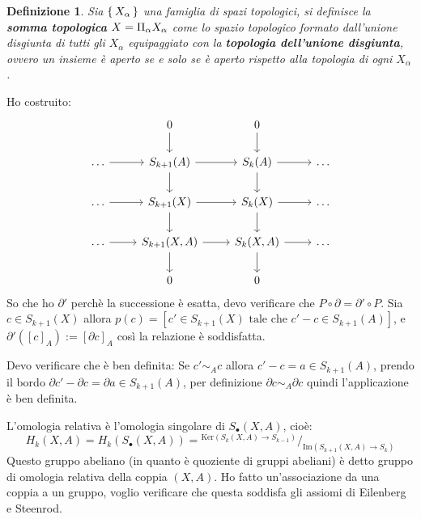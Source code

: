 \documentclass[10pt, twoside=false, x11names]{scrbook}
\newtheorem{definition}[theorem]{Definizione}
\newcommand{\im}[1]{\mathrm{Im}( #1 )}
\renewcommand{\ker}[1]{\mathrm{Ker}( #1)}
\newcommand{\invamalg}{\mathbin{\text{\rotatebox[origin=c]{180}{$\amalg$}}}}
\newcommand*\quot[2]{{^{\textstyle #1}\big/_{\textstyle #2}}}
\begin{document}
\begin{definition}
  Sia $ \set{X_\alpha} $ una famiglia di spazi topologici, si definisce la \textbf{somma topologica}
  $ X = \invamalg_\alpha X_\alpha $
  come lo spazio topologico formato dall'unione disgiunta di tutti gli $ X_\alpha $ equipaggiato
  con la \textbf{topologia dell'unione disgiunta},
  ovvero un insieme è aperto se e solo se è aperto rispetto alla topologia di ogni $ X_\alpha $.
\end{definition}


Ho costruito:
\[
  \begin{tikzcd}
    {} & 0 \arrow{d}{} & 0 \arrow{d}{} & {} \\
    \dots \arrow{r}{} & S_{k+1}(A) \arrow{r}{} \arrow{d}{} & S_k(A) \arrow{r}{} \arrow{d}{} & \dots \\
    \dots \arrow{r}{} & S_{k+1}(X) \arrow{r}{} \arrow{d}{} & S_k(X) \arrow{r}{} \arrow{d}{} & \dots \\
    \dots \arrow{r}{} & S_{k+1}(X,A) \arrow{r}{} \arrow{d}{} & S_k(X,A) \arrow{r}{} \arrow{d}{}& \dots \\
    {} & 0 & 0 & {}
  \end{tikzcd}
\]
So che ho $ \partial' $ perchè la successione è esatta, devo verificare che $ P \circ \partial = \partial' \circ P $.
Sia $ c \in S_{k+1}(X) $ allora $ p(c) = [c' \in S_{k+1}(X) \text{ tale che } c'-c \in S_{k+1}(A)] $,
e $ \partial'([c]_A) := [\partial c]_A $ così la relazione è soddisfatta.

Devo verificare che è ben definita:
Se $ c' \sim_A c $ allora $ c' - c = a \in S_{k+1}(A) $, prendo il bordo $ \partial c' - \partial c = \partial a \in S_{k+1}(A) $,
per definizione $ \partial c \sim_A \partial c $ quindi l'applicazione è ben definita.

L'omologia relativa è l'omologia singolare di $ S_\bullet(X, A) $, cioè:
\[
  H_k(X,A) = H_k(S_\bullet(X,A)) = \quot{\ker{S_k(X,A) \to S_{k-1}}}{\im{S_{k+1}(X,A) \to S_{k}}}
\]
Questo gruppo abeliano (in quanto è quoziente di gruppi abeliani) è detto
gruppo di omologia relativa della coppia  $ (X, A) $.
Ho fatto un'associazione da una coppia a un gruppo, voglio verificare che questa
soddisfa gli assiomi di Eilenberg e Steenrod.
\end{document}
